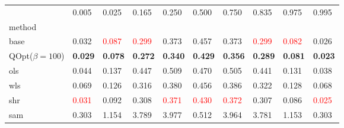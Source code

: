 \begin{tabular}{llllllllll}
\toprule
 & 0.005 & 0.025 & 0.165 & 0.250 & 0.500 & 0.750 & 0.835 & 0.975 & 0.995 \\
method &  &  &  &  &  &  &  &  &  \\
\midrule
base & 0.032 & \textcolor{red}{0.087} & \textcolor{red}{0.299} & 0.373 & 0.457 & 0.373 & \textcolor{red}{0.299} & \textcolor{red}{0.082} & 0.026 \\
\midrule
QOpt($\beta=100$) & \textbf{0.029} & \textbf{0.078} & \textbf{0.272} & \textbf{0.340} & \textbf{0.429} & \textbf{0.356} & \textbf{0.289} & \textbf{0.081} & \textbf{0.023} \\
ols & 0.044 & 0.137 & 0.447 & 0.509 & 0.470 & 0.505 & 0.441 & 0.131 & 0.038 \\
wls & 0.069 & 0.126 & 0.316 & 0.380 & 0.456 & 0.386 & 0.322 & 0.128 & 0.068 \\
shr & \textcolor{red}{0.031} & 0.092 & 0.308 & \textcolor{red}{0.371} & \textcolor{red}{0.430} & \textcolor{red}{0.372} & 0.307 & 0.086 & \textcolor{red}{0.025} \\
sam & 0.303 & 1.154 & 3.789 & 3.977 & 0.512 & 3.964 & 3.781 & 1.153 & 0.303 \\
\bottomrule
\end{tabular}